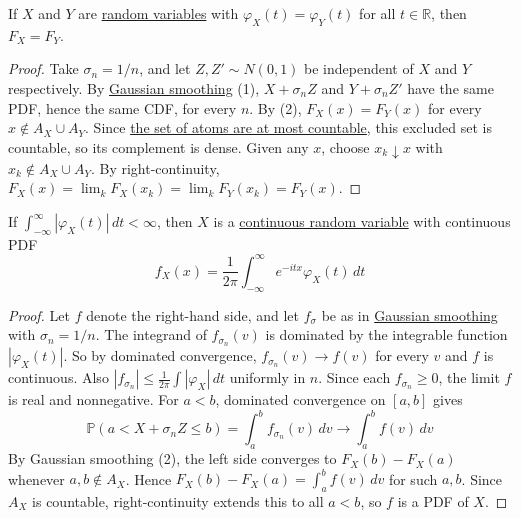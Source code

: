 	\begin{theorem}
	  \label{thm:inversion-theorem-cf}
		If $X$ and $Y$ are \hyperref[def:random-variable]{random variables} with $\varphi_X (t) = \varphi_Y (t)$ for all $t \in \mathbb{R}$, then $F_X = F_Y$. 
	\end{theorem}
	\begin{proof}
		Take $\sigma_n = 1/n$, and let $Z, Z' \sim N(0, 1)$ be independent of $X$ and $Y$ respectively. By \hyperref[thm:gaussian-smoothing]{Gaussian smoothing} (1), $X + \sigma_n Z$ and $Y + \sigma_n Z'$ have the same PDF, hence the same CDF, for every $n$. By (2), $F_X (x) = F_Y (x)$ for every $x \notin A_X \cup A_Y$. Since \hyperref[thm:countable-atoms]{the set of atoms are at most countable}, this excluded set is countable, so its complement is dense. Given any $x$, choose $x_k \downarrow x$ with $x_k \notin A_X \cup A_Y$. By right-continuity, $F_X (x) = \lim_k F_X (x_k) = \lim_k F_Y (x_k) = F_Y (x)$. 
	\end{proof}

	\begin{corollary}
	  \label{thm:inversion-formula-for-integrable-cfs}
		If $\int_{-\infty}^\infty |\varphi_X (t)| \,dt < \infty$, then $X$ is a \hyperref[def:continuous-random-variable]{continuous random variable} with continuous PDF 
		\begin{equation}
			f_X (x) = \frac{1}{2 \pi} \int_{-\infty}^\infty e^{- i t x} \varphi_X (t) \,dt
		\end{equation}
	\end{corollary}
	\begin{proof}
		Let $f$ denote the right-hand side, and let $f_\sigma$ be as in \hyperref[thm:gaussian-smoothing]{Gaussian smoothing} with $\sigma_n = 1/n$. The integrand of $f_{\sigma_n} (v)$ is dominated by the integrable function $|\varphi_X (t)|$. So by dominated convergence, $f_{\sigma_n} (v) \to f(v)$ for every $v$ and $f$ is continuous. Also $|f_{\sigma_n}| \leq \frac{1}{2\pi} \int |\varphi_X| \,dt$ uniformly in $n$. Since each $f_{\sigma_n} \geq 0$, the limit $f$ is real and nonnegative. For $a < b$, dominated convergence on $[a, b]$ gives 
		\begin{equation}
			\mathbb{P}(a < X + \sigma_n Z \leq b) = \int_a^b f_{\sigma_n} (v) \,dv \to \int_a^b f(v) \,dv
		\end{equation}
		By Gaussian smoothing (2), the left side converges to $F_X (b) - F_X (a)$ whenever $a, b \notin A_X$. Hence $F_X (b) - F_X (a) = \int_a^b f(v) \,dv$ for such $a, b$. Since $A_X$ is countable, right-continuity extends this to all $a < b$, so $f$ is a PDF of $X$. 
	\end{proof}

